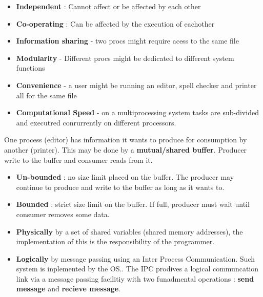 \documentclass[a4paper, 10pt]{article}
\begin{document}
\begin{conceptbox}
    \begin{itemize}
        \item \textbf{Independent} : Cannot affect or be affected by each other
        \item \textbf{Co-operating} : Can be affected by the execution of eachother
    \end{itemize}
\end{conceptbox}
\begin{conceptbox}
    \begin{itemize}
        \item \textbf{Information sharing} - two procs might require acess to the same file
        \item \textbf{Modularity} - Different procs might be dedicated to different system functions
        \item \textbf{Convenience} - a user might be running an editor, spell checker and printer all for the same file
        \item \textbf{Computational Speed} - on a multiprocessing system tasks are sub-divided and executred conrurrently on different processors.
    \end{itemize}
\end{conceptbox}

\begin{definitionbox}
    One process (editor) has information it wants to produce for consumption by another (printer). This may be done by a \textbf{mutual/shared buffer}. Producer write to the buffer and consumer reads from it.
\end{definitionbox}
\begin{conceptbox}
    \begin{itemize}
        \item \textbf{Un-bounded} : no size limit placed on the buffer. The producer may continue to produce and write to the buffer as long as it wants to.
        \item \textbf{Bounded} : strict size limit on the buffer. If full, producer must wait until consumer removes some data.
    \end{itemize}
\end{conceptbox}
\begin{conceptbox}
    \begin{itemize}
        \item \textbf{Physically} by a set of shared variables (shared memory addresses), the implementation of this is the responsibility of the programmer.
        \item \textbf{Logically} by message passing using an Inter Process Communication. Such system is inplemented by the OS.. The IPC prodives a logical communcation link via a message passing facilitiy with two funadmental operations : \textbf{send message} and \textbf{recieve message}.
    \end{itemize}
\end{conceptbox}
\end{document}
